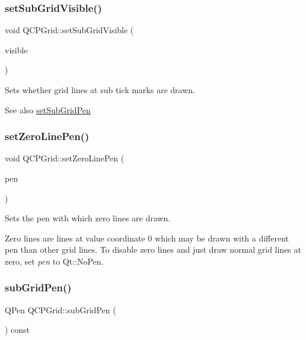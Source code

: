 \subsubsection{\texorpdfstring{set\+Sub\+Grid\+Visible()}{setSubGridVisible()}}
{\footnotesize\ttfamily void Q\+C\+P\+Grid\+::set\+Sub\+Grid\+Visible (\begin{DoxyParamCaption}\item[{bool}]{visible }\end{DoxyParamCaption})}

Sets whether grid lines at sub tick marks are drawn.

\begin{DoxySeeAlso}{See also}
\hyperlink{class_q_c_p_grid_a9edd3593f384d1f0b0202a39cef4453d}{set\+Sub\+Grid\+Pen} 
\end{DoxySeeAlso}
\mbox{\label{class_q_c_p_grid_a209f40fdb252397b418b82d3494d8ea0}} 
\subsubsection{\texorpdfstring{set\+Zero\+Line\+Pen()}{setZeroLinePen()}}
{\footnotesize\ttfamily void Q\+C\+P\+Grid\+::set\+Zero\+Line\+Pen (\begin{DoxyParamCaption}\item[{const Q\+Pen \&}]{pen }\end{DoxyParamCaption})}

Sets the pen with which zero lines are drawn.

Zero lines are lines at value coordinate 0 which may be drawn with a different pen than other grid lines. To disable zero lines and just draw normal grid lines at zero, set {\itshape pen} to Qt\+::\+No\+Pen. \mbox{\label{class_q_c_p_grid_ae231e5b87e68689a666f90531a15552f}} 
\subsubsection{\texorpdfstring{sub\+Grid\+Pen()}{subGridPen()}}
{\footnotesize\ttfamily Q\+Pen Q\+C\+P\+Grid\+::sub\+Grid\+Pen (\begin{DoxyParamCaption}{ }\end{DoxyParamCaption}) const\hspace{0.3cm}{\ttfamily [inline]}}

